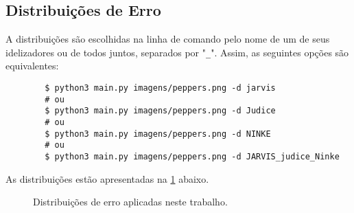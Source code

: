 \subsection{Distribuições de Erro} \label{sec:distribuicoes}

    A distribuições são escolhidas na linha de comando pelo nome de um de seus idelizadores ou de todos juntos, separados por "\texttt{\_}". Assim, as seguintes opções são equivalentes:

    \begin{verbatim}
        $ python3 main.py imagens/peppers.png -d jarvis
        # ou
        $ python3 main.py imagens/peppers.png -d Judice
        # ou
        $ python3 main.py imagens/peppers.png -d NINKE
        # ou
        $ python3 main.py imagens/peppers.png -d JARVIS_judice_Ninke
    \end{verbatim}

    As distribuições estão apresentadas na \cref{fig:distribuicoes} abaixo.

    \begin{figure}[H]
        \centering
        
        \caption{Distribuições de erro aplicadas neste trabalho.}
        \label{fig:distribuicoes}
    \end{figure}
